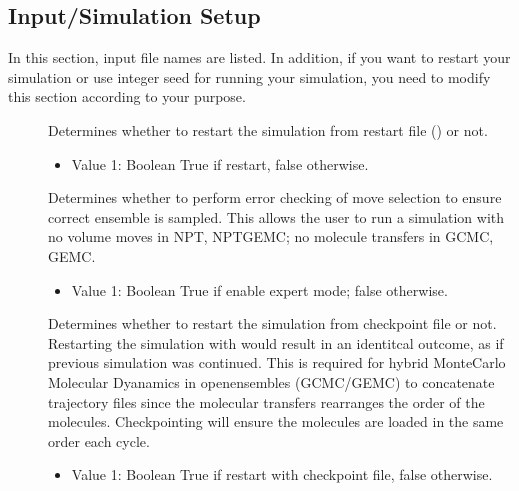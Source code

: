 \documentclass[letterpaper,10pt,english]{sphinxmanual}
\begin{document}
\subsection{Input/Simulation Setup}
\label{\detokenize{input_file:input-simulation-setup}}
\sphinxAtStartPar
In this section, input file names are listed. In addition, if you want to restart your simulation or use integer seed for running your simulation, you need to modify this section according to your purpose.
\begin{description}
\item[{}] \leavevmode
\sphinxAtStartPar
Determines whether to restart the simulation from restart file () or not.
\begin{itemize}
\item {} 
\sphinxAtStartPar
Value 1: Boolean \sphinxhyphen{} True if restart, false otherwise.

\end{itemize}

\item[{}] \leavevmode
\sphinxAtStartPar
Determines whether to perform error checking of move selection to ensure correct ensemble is sampled.  This allows the user to run a simulation with no volume moves in NPT, NPT\sphinxhyphen{}GEMC; no molecule transfers in GCMC, GEMC.
\begin{itemize}
\item {} 
\sphinxAtStartPar
Value 1: Boolean \sphinxhyphen{} True if enable expert mode; false otherwise.

\end{itemize}

\item[{}] \leavevmode
\sphinxAtStartPar
Determines whether to restart the simulation from checkpoint file or not. Restarting the simulation with would result in
an identitcal outcome, as if previous simulation was continued.  This is required for hybrid Monte\sphinxhyphen{}Carlo Molecular Dyanamics in open\sphinxhyphen{}ensembles (GCMC/GEMC) to concatenate trajectory files since the molecular transfers rearranges the order of the molecules.  Checkpointing will ensure the molecules are loaded in the same order each cycle.
\begin{itemize}
\item {} 
\sphinxAtStartPar
Value 1: Boolean \sphinxhyphen{} True if restart with checkpoint file, false otherwise.


\end{itemize}
\end{description}
\end{document}
